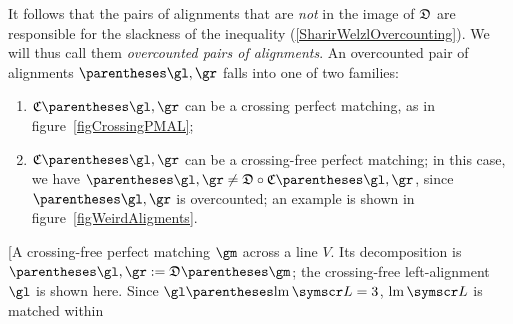 It follows that the pairs of alignments that are \emph{not} in the image of $\mathfrak{D}$ are responsible
for the slackness of the inequality (\ref{SharirWelzlOvercounting}). We will thus call them
\emph{overcounted pairs of alignments}.
An overcounted pair of alignments $\tuple{\gl,\gr}$ falls into one of two families:
\begin{enumerate}
\item
$\composition\of{\gl,\gr}$ can be a crossing perfect matching, as in figure~\ref{figCrossingPMAL};
\item $\composition\of{\gl,\gr}$ can be a crossing-free perfect matching;
in this case, we have $\tuple{\gl,\gr}\neq\decomposition\Compose\composition\of{\gl,\gr}$,
since $\tuple{\gl,\gr}$ is overcounted; an example is shown in figure~\ref{figWeirdAligments}.
\end{enumerate}
\marginfig[A crossing-free perfect matching $\gm$ across a line $V$.
Its decomposition is $\tuple{\gl,\gr}\DefineAs\decomposition\of\gm$;
the crossing-free left-alignment $\gl$ is shown here. Since
$\gl\of{\leftmost\pointset L}=3$, $\leftmost\pointset L$ is matched within
